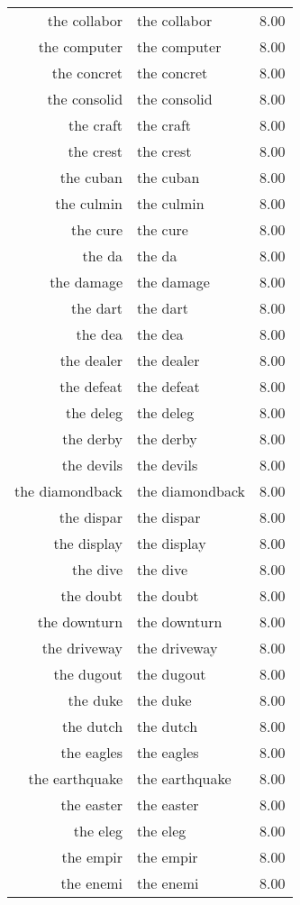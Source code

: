 \begin{table}[ht]
\begin{tabular}{rlr}
  the collabor & the collabor & 8.00 \\ 
  the computer & the computer & 8.00 \\ 
  the concret & the concret & 8.00 \\ 
  the consolid & the consolid & 8.00 \\ 
  the craft & the craft & 8.00 \\ 
  the crest & the crest & 8.00 \\ 
  the cuban & the cuban & 8.00 \\ 
  the culmin & the culmin & 8.00 \\ 
  the cure & the cure & 8.00 \\ 
  the da & the da & 8.00 \\ 
  the damage & the damage & 8.00 \\ 
  the dart & the dart & 8.00 \\ 
  the dea & the dea & 8.00 \\ 
  the dealer & the dealer & 8.00 \\ 
  the defeat & the defeat & 8.00 \\ 
  the deleg & the deleg & 8.00 \\ 
  the derby & the derby & 8.00 \\ 
  the devils & the devils & 8.00 \\ 
  the diamondback & the diamondback & 8.00 \\ 
  the dispar & the dispar & 8.00 \\ 
  the display & the display & 8.00 \\ 
  the dive & the dive & 8.00 \\ 
  the doubt & the doubt & 8.00 \\ 
  the downturn & the downturn & 8.00 \\ 
  the driveway & the driveway & 8.00 \\ 
  the dugout & the dugout & 8.00 \\ 
  the duke & the duke & 8.00 \\ 
  the dutch & the dutch & 8.00 \\ 
  the eagles & the eagles & 8.00 \\ 
  the earthquake & the earthquake & 8.00 \\ 
  the easter & the easter & 8.00 \\ 
  the eleg & the eleg & 8.00 \\ 
  the empir & the empir & 8.00 \\ 
  the enemi & the enemi & 8.00 \\ 

\end{tabular}
\end{table}
